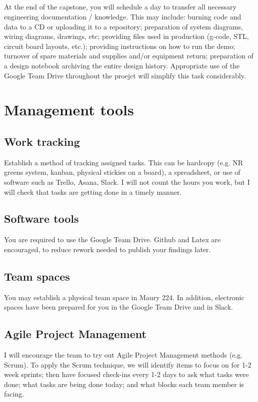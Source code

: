 \documentclass[10pt,courier]{navymemo}
\begin{document}
\subsection{} At the end of the capstone, you will schedule a day to transfer all necessary engineering documentation / knowledge.  This may include: burning code and data to a CD or uploading it to a repository; preparation of system diagrams, wiring diagrams, drawings, etc; providing files used in production (g-code, STL, circuit board layouts, etc.); providing instructions on how to run the demo; turnover of spare materials and supplies and/or equipment return; preparation of a design notebook archiving the entire design history. Appropriate use of the Google Team Drive throughout the proejct will simplify this task considerably.

\section{Management tools} 

\subsection{Work tracking} Establish a method of tracking assigned tasks. This can be hardcopy (e.g. NR greens system, kanban, physical stickies on a board), a spreadsheet, or use of software such as Trello, Asana, Slack. I will not count the hours you work, but I will check that tasks are getting done in a timely manner. 

\subsection{Software tools} You are required to use the Google Team Drive. Github and Latex are encouraged, to reduce rework needed to publish your findings later. 

\subsection{Team spaces} You may establish a physical team space in Maury 224. In addition, electronic spaces have been prepared for you in the Google Team Drive and in Slack. 

\subsection{Agile Project Management} I will encourage the team to try out Agile Project Management methods (e.g. Scrum). To apply the Scrum technique, we will identify items to focus on for 1-2 week sprints; then have focused check-ins every 1-2 days to ask what tasks were done; what tasks are being done today; and what blocks each team member is facing. 
\end{document}
